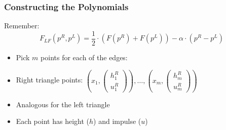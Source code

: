 \documentclass{beamer}
\begin{document}
\begin{frame}
  \frametitle{Constructing the Polynomials}
  Remember:
  \begin{equation*}
    F_{LF}(p^R,p^L) = \dfrac{1}{2}\cdot (F(p^R) + F(p^L)) - \alpha \cdot (p^R - p^L)
  \end{equation*}
  \begin{itemize}
  \item Pick $m$ points for each of the edges: 
  \item Right triangle points: $\left(x_1,\begin{pmatrix}
        h_1^R \\ u_1^R
      \end{pmatrix}\right), \dots , \left(x_m, \begin{pmatrix}
        h_m^R \\ u_m^R
      \end{pmatrix}\right)$
  \item Analogous for the left triangle
  \item Each point has height ($h$) and impulse ($u$)

  \end{itemize}


\end{frame}
\end{document}
